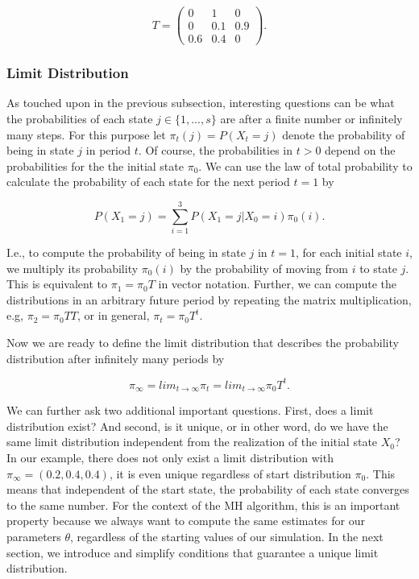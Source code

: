 \documentclass[12pt,english,a4paper,oneside]{article}
\theoremstyle{definition}
\theoremstyle{definition}
\theoremstyle{definition}
\theoremstyle{definition}
\theoremstyle{remark}
\begin{document}
\begin{equation}
\label{eq:transition-matrix}
T=
\begin{pmatrix}
0 & 1 & 0\\
0 & 0.1 & 0.9\\
0.6 & 0.4 & 0
\end{pmatrix}
.
\end{equation}

\hypertarget{limit-distribution}{%
\subsubsection{Limit Distribution}\label{limit-distribution}}

As touched upon in the previous subsection, interesting questions can be what the probabilities of each state \(j \in \{1, ..., s\}\) are after a finite number or infinitely many steps. For this purpose let \(\pi_t (j) = P(X_t = j)\) denote the probability of being in state \(j\) in period \(t\). Of course, the probabilities in \(t>0\) depend on the probabilities for the the initial state \(\pi_0\). We can use the law of total probability to calculate the probability of each state for the next period \(t=1\) by

\begin{equation}
\label{eq:tot-prob}
P(X_1 = j) = \sum_{i=1}^{3} P(X_1 = j | X_0 = i) \pi_0(i).
\end{equation}

\noindent
I.e., to compute the probability of being in state \(j\) in \(t=1\), for each initial state \(i\), we multiply its probability \(\pi_0(i)\) by the probability of moving from \(i\) to state \(j\). This is equivalent to \(\pi_1 = \pi_0 T\) in vector notation. Further, we can compute the distributions in an arbitrary future period by repeating the matrix multiplication, e.g, \(\pi_2 = \pi_0 T T\), or in general, \(\pi_t = \pi_0 T^t\).

Now we are ready to define the limit distribution that describes the probability distribution after infinitely many periods by

\begin{equation}
\label{eq:lim-dist}
\pi_{\infty} = lim_{t \rightarrow \infty} \pi_t = lim_{t \rightarrow \infty} \pi_0 T^t.
\end{equation}

\noindent
We can further ask two additional important questions. First, does a limit distribution exist? And second, is it unique, or in other word, do we have the same limit distribution independent from the realization of the initial state \(X_0\)? In our example, there does not only exist a limit distribution with \(\pi_{\infty} = (0.2, 0.4, 0.4)\), it is even unique regardless of start distribution \(\pi_0\). This means that independent of the start state, the probability of each state converges to the same number. For the context of the MH algorithm, this is an important property because we always want to compute the same estimates for our parameters \(\theta\), regardless of the starting values of our simulation. In the next section, we introduce and simplify conditions that guarantee a unique limit distribution.
\end{document}
